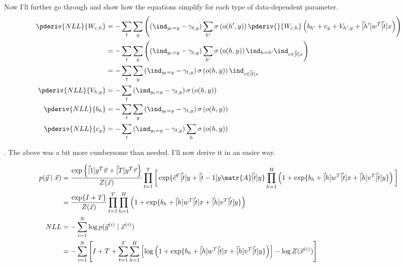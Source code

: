 \documentclass[11pt]{article}
\begin{document}
Now I'll further go through and show how the equations simplify for each type of data-dependent parameter.
\begin{align}
\pderiv{NLL}{W_{c,h}}
&= -\sum_t \sum_y \left( \left(
\ind_{y_t = y} -  \gamma_{t,y} \right) 
\sum_{h'}   \sigma\left(o(h', y)\right) \pderiv{}{W_{c,h}} \left( b_{h'} + c_y + V_{h',y} + \vec[h']{w}^T \vec[t]{x}  \right) \right) \\
&= -\sum_t \sum_y \left( \left(
\ind_{y_t = y} -  \gamma_{t,y} \right) 
\sum_{h'}  \sigma\left(o(h, y)\right) \ind_{h=h'}\ind_{c \in \vec[t]{x}} \right) \\
&= -\sum_t \sum_y \left( 
\ind_{y_t = y} -  \gamma_{t,y} \right) 
\sigma\left(o(h, y)\right) \ind_{c \in \vec[t]{x}}  \\
\pderiv{NLL}{V_{h,y}} 
&= -\sum_t \left( 
\ind_{y_t = y} -  \gamma_{t,y} \right) 
\sigma\left(o(h, y)\right)   \\
\pderiv{NLL}{b_h}
&= -\sum_t \sum_y \left( 
\ind_{y_t = y} -  \gamma_{t,y} \right) 
\sigma\left(o(h, y)\right)  \\
\pderiv{NLL}{c_y}
&= -\sum_t  \left( 
\ind_{y_t = y} -  \gamma_{t,y} \right) 
\sum_h \sigma\left(o(h, y)\right)   \\
\end{align}


\myspace
\p {}. The above was a bit more cumbersome than needed. I'll now derive it in an easier way. 

\begin{small}
	\begin{align}
	p(\vec y \mid \vec x) 
	&= \frac{\exp\left\{ \vec[1]{y}^T \vec{\pi} + \vec[T]{y}^T \vec{\tau}  \right\}}{Z(\vec x)} \prod_{t=1}^{T}\bigg[ 
	\exp\{ \vec{c}^T \vec[t]{y} + \vec[t-1]{y}\matr{A}\vec[t]{y}   \}  
	\prod_{h = 1}^{H} \left( 1 + \exp\{ b_h + \vec[h]{w}^T \vec[t]{x} + \vec[h]{v}^T \vec[t]{y}  \} \right)	\bigg] \\
	&= \frac{\exp\{ I + T \}}{Z(\vec x)} \prod_{t=1}^{T}
	\prod_{h = 1}^{H} \left( 1 + \exp\{ b_h + \vec[h]{w}^T \vec[t]{x} + \vec[h]{v}^T \vec[t]{y}  \} \right)
	\\
	NLL 
	&= - \sum_{i=1}^{N} \log p(\vec{y}^{(i)} \mid \vec{x}^{(i)}) \\
	&= - \sum_{i=1}^{N} \left[ 
	I + T + 
	\sum_{t = 1}^{T} \sum_{h=1}^{H} \left[ \log \left( 1 + \exp\{ b_h + \vec[h]{w}^T \vec[t]{x} + \vec[h]{v}^T \vec[t]{y}  \} \right) \right]
	- \log Z(\vec{x}^{(i)})
	\right]
	\end{align}
\end{small}
\end{document}
